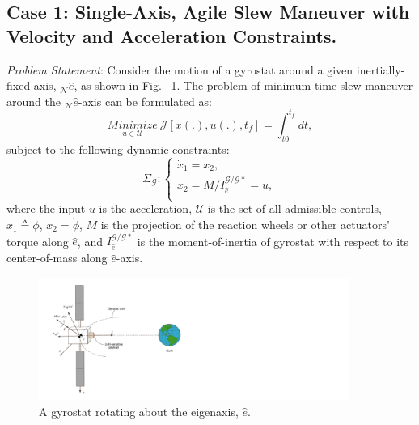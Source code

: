 \documentclass[journal ]{new-aiaa}
\begin{document}
	\subsection{Case 1: Single-Axis, Agile Slew Maneuver with Velocity and Acceleration Constraints.}	 
	{\it Problem Statement}: Consider the motion of a gyrostat around a given inertially-fixed axis, $_\mathcal{N}\hat{e}$, as shown in Fig. ~\ref{s/c}. The problem of minimum-time slew maneuver around the $_\mathcal{N}\hat{e}$-axis can be formulated as:	
	\begin{equation}\label{costfunction}
	\underset{u\in \mathcal{U}}{Minimize}\ \mathcal{J}[x(.), u(.), t_f]=\int_{t0}^{t_f} dt,
	\end{equation}	
	subject to the following dynamic constraints:	
	\begin{equation}\label{system}
	\Sigma_\mathcal{G}:\left\{
	\begin{array}{l}
	\dot{x}_1=x_2, \\
	\dot{x}_2=M/I_{\hat{e}}^{\mathcal{G/G*}}=u, \\
	\end{array}
	\right.
	\end{equation}
	where the input $u$ is the acceleration, $\mathcal{U}$ is the set of all admissible controls, $x_1 \triangleq\phi$, $x_2=\dot{\phi}$, $M$ is the projection of the reaction wheels or other actuators' torque along $\hat{e}$, and $I_{\hat{e}}^{\mathcal{G/G*}}$ is the moment-of-inertia of gyrostat with respect to its center-of-mass along $\hat{e}$-axis. 
	
	\begin{figure}[h!]
		\centering
			\includegraphics[width=4in]{./Figures/Spacecraft_earth}  
			\caption{A gyrostat rotating about the eigenaxis, $\hat{e}$.}
			\label{s/c}
	\end{figure}
	
\end{document}
